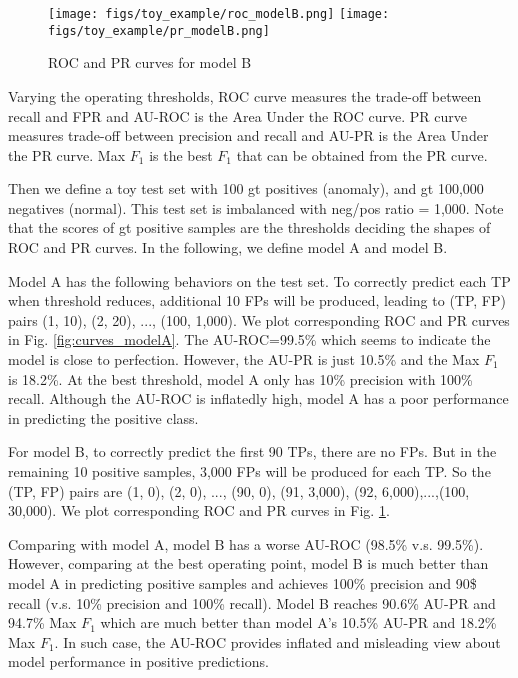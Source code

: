 \documentclass[runningheads]{llncs}
\begin{document}
\begin{figure}[!ht]
\centering
\texttt{[image: figs/toy\_example/roc\_modelB.png]}
\texttt{[image: figs/toy\_example/pr\_modelB.png]}\\
 \caption{ROC and PR curves for model B}
 \label{fig:curves_modelB}
\end{figure}

Varying the operating thresholds, ROC curve measures the trade-off between recall and FPR and AU-ROC is the Area Under the ROC curve. PR curve measures trade-off between precision and recall and AU-PR is the Area Under the PR curve. Max $F_1$ is the best $F_1$ that can be obtained from the PR curve.

Then we define a toy test set with 100 gt positives (anomaly), and gt 100,000 negatives (normal). This test set is imbalanced with neg/pos ratio = 1,000. Note that the scores of gt positive samples are the thresholds deciding the shapes of ROC and PR curves. In the following, we define model A and model B.

Model A has the following behaviors on the test set. To correctly predict each TP when threshold reduces, additional 10 FPs will be produced, leading to (TP, FP) pairs (1, 10), (2, 20), ..., (100, 1,000). We plot corresponding ROC and PR curves in Fig. \ref{fig:curves_modelA}. The AU-ROC=99.5\% which seems to indicate the model is close to perfection. However, the AU-PR is just 10.5\% and the Max $F_1$ is 18.2\%. At the best threshold, model A only has 10\% precision with 100\% recall. Although the AU-ROC is inflatedly high, model A has a poor performance in predicting the positive class. 

For model B, to correctly predict the first 90 TPs, there are no FPs. But in the remaining 10 positive samples, 3,000 FPs will be produced for each TP. So the (TP, FP) pairs are (1, 0), (2, 0), ..., (90, 0), (91, 3,000), (92, 6,000),...,(100, 30,000). We plot corresponding ROC and PR curves in Fig. \ref{fig:curves_modelB}. 

Comparing with model A, model B has a worse AU-ROC (98.5\% v.s. 99.5\%). However, comparing at the best operating point, model B is much better than model A in predicting positive samples and achieves 100\% precision and 90\$ recall (v.s. 10\% precision and 100\% recall). Model B reaches 90.6\% AU-PR and 94.7\% Max $F_1$ which are much better than model A’s 10.5\% AU-PR and 18.2\% Max $F_1$. In such case, the AU-ROC provides inflated and misleading view about model performance in positive predictions.
\end{document}
